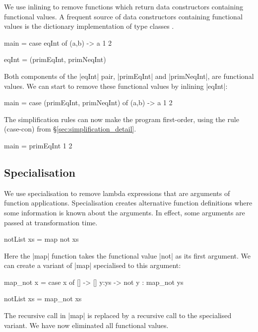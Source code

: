 \documentclass[preprint]{sigplanconf}
\begin{document}
We use inlining to remove functions which return data constructors containing functional values. A frequent source of data constructors containing functional values is the dictionary implementation of type classes \cite{wadler:type_classes}.

\begin{example}
\begin{code}
main = case  eqInt of
             (a,b) -> a 1 2

eqInt = (primEqInt, primNeqInt)
\end{code}

Both components of the |eqInt| pair, |primEqInt| and |primNeqInt|, are functional values. We can start to remove these functional values by inlining |eqInt|:

\begin{code}
main = case  (primEqInt, primNeqInt) of
             (a,b) -> a 1 2
\end{code}

\noindent The simplification rules can now make the program first-order, using the rule (case-con) from \S\ref{sec:simplification_detail}.

\begin{code}
main = primEqInt 1 2
\end{code}\codeexample
\end{example}

\subsection{Specialisation}

We use specialisation to remove lambda expressions that are arguments of function applications. Specialisation creates alternative function definitions where some information is known about the arguments. In effect, some arguments are passed at transformation time.

\begin{example}
\begin{code}
notList xs = map not xs
\end{code}

\noindent Here the |map| function takes the functional value |not| as its first argument. We can create a variant of |map| specialised to this argument:

\begin{code}
map_not x = case  x of
                  []    -> []
                  y:ys  -> not y : map_not ys

notList xs = map_not xs
\end{code}

\noindent The recursive call in |map| is replaced by a recursive call to the specialised variant. We have now eliminated all functional values.
\end{example}
\end{document}
